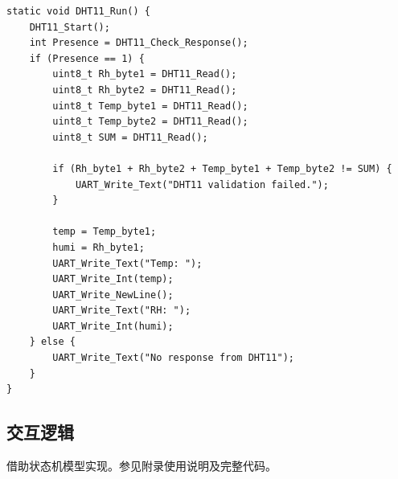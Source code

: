\documentclass[a4paper,11pt,UTF8]{ctexart}
\begin{document}
\begin{lstlisting}[caption={DHT11},captionpos=b]
static void DHT11_Run() {
    DHT11_Start();
    int Presence = DHT11_Check_Response();
    if (Presence == 1) {
        uint8_t Rh_byte1 = DHT11_Read();
        uint8_t Rh_byte2 = DHT11_Read();
        uint8_t Temp_byte1 = DHT11_Read();
        uint8_t Temp_byte2 = DHT11_Read();
        uint8_t SUM = DHT11_Read();

        if (Rh_byte1 + Rh_byte2 + Temp_byte1 + Temp_byte2 != SUM) {
            UART_Write_Text("DHT11 validation failed.");
        }

        temp = Temp_byte1;
        humi = Rh_byte1;
        UART_Write_Text("Temp: ");
        UART_Write_Int(temp);
        UART_Write_NewLine();
        UART_Write_Text("RH: ");
        UART_Write_Int(humi);
    } else {
        UART_Write_Text("No response from DHT11");
    }
}

\end{lstlisting}

\subsection{交互逻辑}

借助状态机模型实现。参见附录使用说明及完整代码。
\end{document}
